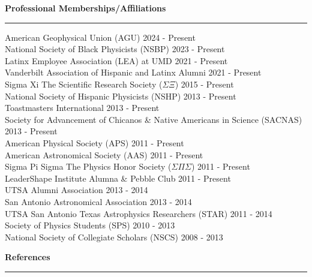 \documentclass[letter,12pt]{article}
\begin{document}
\newpage
\noindent
{\bf Professional Memberships/Affiliations} \\
\vspace{-10mm}
\begin{center}
\rule{\textwidth}{0.2mm}
\end{center}
\vspace{-3mm}
{ 

\small 
\noindent 
American Geophysical Union (AGU) \hfill 2024 - Present \\
National Society of Black Physicists (NSBP) \hfill 2023 - Present \\
Latinx Employee Association (LEA) at UMD \hfill 2021 - Present \\
Vanderbilt Association of Hispanic and Latinx Alumni \hfill 2021 - Present \\
Sigma Xi \text{\textbar} The Scientific Research Society ($\Sigma \Xi$) \hfill 2015 - Present \\
National Society of Hispanic Physicists (NSHP) \hfill 2013 - Present \\
Toastmasters International \hfill 2013 - Present \\
Society for Advancement of Chicanos \& Native Americans in Science (SACNAS) \hfill 2013 - Present  \\
American Physical Society (APS) \hfill 2011 - Present \\
American Astronomical Society (AAS) \hfill 2011 - Present \\
Sigma Pi Sigma \text{\textbar} The Physics Honor Society ($\Sigma \Pi \Sigma$) \hfill 2011 - Present \\
LeaderShape Institute Alumna \& Pebble Club \hfill 2011 - Present \\
UTSA Alumni Association \hfill 2013 - 2014 \\
San Antonio Astronomical Association \hfill 2013 - 2014 \\
UTSA San Antonio Texas Astrophysics Researchers (STAR) \hfill 2011 - 2014 \\
Society of Physics Students (SPS) \hfill 2010 - 2013 \\
National Society of Collegiate Scholars (NSCS) \hfill 2008 - 2013 \\
}

\newpage
\noindent
{\bf References} \\
\vspace{-10mm}
\begin{center}
\rule{\textwidth}{0.2mm}
\end{center}
\vspace{-3mm}
\end{document}
